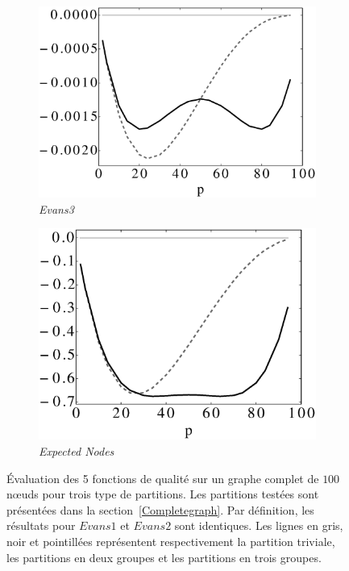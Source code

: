 \begin{figure}[h]
	\begin{subfigure}{0.35\linewidth}
		\includegraphics[width=\linewidth]{img/ExpectedNodes/1Clique/Clique_Evans3.eps}
		\caption{\label{fig:1CE3}\emph{Evans3}}		
	\end{subfigure}\hspace*{1cm}
	\begin{subfigure}{0.35\linewidth}
		\includegraphics[width=\linewidth]{img/ExpectedNodes/1Clique/Clique_Expectednode.eps}
		\caption{\label{fig:1CMod}\emph{Expected Nodes}}		
	\end{subfigure}
		
		\caption{\'Evaluation des 5 fonctions de qualité sur un graphe complet  de $100$ n\oe{}uds pour trois type de partitions.
		Les partitions testées sont présentées dans la section~\ref{Completegraph}.
		Par définition, les résultats pour $Evans1$ et $Evans2$ sont identiques.
		Les lignes en gris, noir et pointillées représentent respectivement la partition triviale, les partitions en deux groupes et les partitions en trois groupes.}
		\label{fig:1Cres}
\end{figure}

